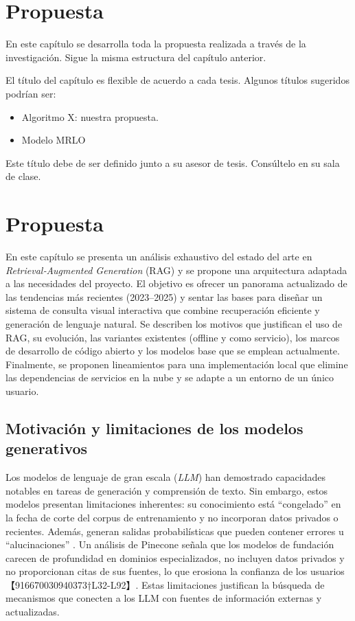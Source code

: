 \chapter{Propuesta}\label{chap:proposal}

En este capítulo se desarrolla toda la propuesta realizada a través de la investigación. Sigue la misma estructura del capítulo anterior.

El título del capítulo es flexible de acuerdo a cada tesis. Algunos títulos sugeridos podrían ser:

\begin{itemize}
\item Algoritmo X: nuestra propuesta.
\item Modelo MRLO
\end{itemize}

Este título debe de ser definido junto a su asesor de tesis. Consúltelo en su sala de clase.
\chapter{Propuesta}
\label{chap:proposal}

En este capítulo se presenta un análisis exhaustivo del estado del arte en \textit{Retrieval‑Augmented Generation} (RAG) y se propone una arquitectura adaptada a las necesidades del proyecto.  El objetivo es ofrecer un panorama actualizado de las tendencias más recientes (2023–2025) y sentar las bases para diseñar un sistema de consulta visual interactiva que combine recuperación eficiente y generación de lenguaje natural.  Se describen los motivos que justifican el uso de RAG, su evolución, las variantes existentes (offline y como servicio), los marcos de desarrollo de código abierto y los modelos base que se emplean actualmente.  Finalmente, se proponen lineamientos para una implementación local que elimine las dependencias de servicios en la nube y se adapte a un entorno de un único usuario.

\section{Motivación y limitaciones de los modelos generativos}

Los modelos de lenguaje de gran escala (\textit{LLM}) han demostrado capacidades notables en tareas de generación y comprensión de texto.  Sin embargo, estos modelos presentan limitaciones inherentes: su conocimiento está ``congelado'' en la fecha de corte del corpus de entrenamiento y no incorporan datos privados o recientes.  Además, generan salidas probabilísticas que pueden contener errores u ``alucinaciones'' \cite{pinecone2025guide}.  Un análisis de Pinecone señala que los modelos de fundación carecen de profundidad en dominios especializados, no incluyen datos privados y no proporcionan citas de sus fuentes, lo que erosiona la confianza de los usuarios【916670030940373†L32-L92】.  Estas limitaciones justifican la búsqueda de mecanismos que conecten a los LLM con fuentes de información externas y actualizadas.

